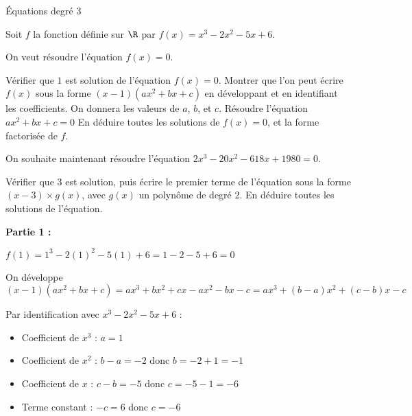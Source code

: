 \vspace{-1mm}
\def\rdifficulty{3}
\begin{EXO}{Équations degré 3}{}
\begin{tcbenumerate}[2]
\tcbitem[boxrule=0.4pt,colframe=black,raster multicolumn=2] Soit $f$ la fonction définie sur $\R$ par $f(x)=x^3-2x^2-5x+6$.

On veut résoudre l'équation $f(x)=0$.
\begin{tcbenumerate}[2][1][alph]
\tcbitem {} Vérifier que $1$ est solution de l'équation $f(x)=0$.
\tcbitem {} Montrer que l'on peut écrire $f(x)$ sous la forme $(x-1)(ax^2+bx+c)$ en développant et en identifiant les coefficients. On donnera les valeurs de $a$, $b$, et $c$.
\tcbitem {} Résoudre l'équation $ax^2+bx+c=0$
\tcbitem {} En déduire toutes les solutions de $f(x)=0$, et la forme factorisée de $f$.
\end{tcbenumerate}
\tcbitem[boxrule=0.4pt,colframe=black,raster multicolumn=2] On souhaite maintenant résoudre l'équation $2x^3-20x^2-618x+1980=0$.
\begin{tcbenumerate}[2][1][alph]
\tcbitem {} Vérifier que $3$ est solution, puis écrire le premier terme de l'équation sous la forme $(x-3)\times g(x)$, avec $g(x)$ un polynôme de degré 2.
\tcbitem {} En déduire toutes les solutions de l'équation.
\end{tcbenumerate}
\end{tcbenumerate}

\exocorrection

\begin{tcbenumerate}[1]
\tcbitem \textbf{Partie 1 :}
\begin{tcbenumerate}[1][1][alph]
\tcbitem $f(1) = 1^3 - 2(1)^2 - 5(1) + 6 = 1 - 2 - 5 + 6 = 0$ \checkmark

\tcbitem On développe $(x-1)(ax^2+bx+c) = ax^3 + bx^2 + cx - ax^2 - bx - c = ax^3 + (b-a)x^2 + (c-b)x - c$

Par identification avec $x^3-2x^2-5x+6$ :
\begin{itemize}
\item Coefficient de $x^3$ : $a = 1$
\item Coefficient de $x^2$ : $b-a = -2$ donc $b = -2+1 = -1$
\item Coefficient de $x$ : $c-b = -5$ donc $c = -5-1 = -6$
\item Terme constant : $-c = 6$ donc $c = -6$ \checkmark
\end{itemize}


\end{tcbenumerate}
\end{tcbenumerate}
\end{EXO}
